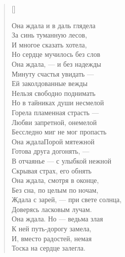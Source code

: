 \settowidth{\versewidth}{Она ждала и в даль глядела\\}
\begin{verse}[\versewidth]
\begin{altverse}
Она ждала и в даль глядела\\
    За синь туманную лесов,\\
И многое сказать хотела,\\
    Но сердце мучилось без слов\ldotst\\
Она ждала, --- и без надежды\\
    Минуту счастья увидать ---\\
Ей заколдованные вежды\\
    Нельзя свободно поднимать\ldotst\\
Но в тайниках души несмелой\\
    Горела пламенная страсть ---\\
Любви запретной, онемелой\\
    Бесследно миг не мог пропасть\ldotst\\
Она ждала\ldotst Порой мятежной\\
    Готова друга догонять, ---\\
В отчаянье --- с улыбкой нежной\\
    Скрывая страх, его обнять\ldotst\\
Она ждала, смотря в оконце,\\
    Без сна, по целым по ночам,\\
Ждала с зарей, --- при свете солнца,\\
    Доверясь ласковым лучам.\\
Она ждала. Но --- ведьма злая\\
    К ней путь-дорогу замела,\\
И, вместо радостей, немая\\
    Тоска на сердце залегла.
\end{altverse}
\end{verse}

\newpage
\vspace*{0cm}


